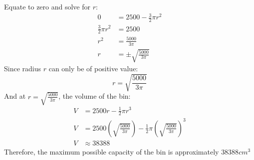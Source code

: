 \documentclass[hidelinks, a4paper, 12pt]{article}
\begin{document}
                Equate to zero and solve for $r$:
                \[\begin{split}
                    0 &= 2500 - \frac{3}{2}\pi r^2\\
                    \frac{3}{2}\pi r^2 &= 2500\\
                    r^2 &= \frac{5000}{3\pi}\\
                    r &= \pm \sqrt{\frac{5000}{3\pi}}
                \end{split}\]
                Since radius $r$ can only be of positive value:
                \[r = \sqrt{\frac{5000}{3\pi}}\]
                And at $r = \sqrt{\frac{5000}{3\pi}}$, the volume of the bin:
                \[\begin{split}
                    V &= 2500r - \frac{1}{2}\pi r^3\\
                    V &= 2500\left(\sqrt{\frac{5000}{3\pi}}\right) - \frac{1}{2} \pi \left(\sqrt{\frac{5000}{3\pi}}\right)^3\\
                    V &\approx 38388
                \end{split}\]
                Therefore, the maximum possible capacity of the bin is approximately $38388cm^3$
    
    
\end{document}
